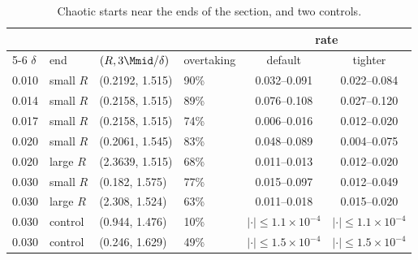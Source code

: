 \begin{table}[!hbp]
\centering\small
\caption{Chaotic starts near the ends of the section, and two controls.}
\label{tab:edge}
\setlength{\tabcolsep}{4pt}
\begin{tabular}{llllcc}
\toprule
 & & & & \multicolumn{2}{c}{rate} \\
\cmidrule(lr){5-6}
$\delta$ & end & $(R, 3\Mmid/\delta)$ & overtaking & default & tighter \\
\midrule
0.010 & small $R$ & (0.2192, 1.515) & 90\% & 0.032--0.091 & 0.022--0.084 \\
0.014 & small $R$ & (0.2158, 1.515) & 89\% & 0.076--0.108 & 0.027--0.120 \\
0.017 & small $R$ & (0.2158, 1.515) & 74\% & 0.006--0.016 & 0.012--0.020 \\
0.020 & small $R$ & (0.2061, 1.545) & 83\% & 0.048--0.089 & 0.004--0.075 \\
0.020 & large $R$ & (2.3639, 1.515) & 68\% & 0.011--0.013 & 0.012--0.020 \\
0.030 & small $R$ & (0.182, 1.575) & 77\% & 0.015--0.097 & 0.012--0.049 \\
0.030 & large $R$ & (2.308, 1.524) & 63\% & 0.011--0.018 & 0.015--0.020 \\
\midrule
0.030 & control & (0.944, 1.476) & 10\% & $|\cdot| \le 1.1\times10^{-4}$ & $|\cdot| \le 1.1\times10^{-4}$ \\
0.030 & control & (0.246, 1.629) & 49\% & $|\cdot| \le 1.5\times10^{-4}$ & $|\cdot| \le 1.5\times10^{-4}$ \\
\bottomrule
\end{tabular}
\end{table}
